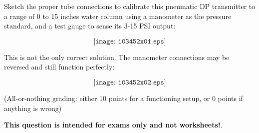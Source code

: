 

Sketch the proper tube connections to calibrate this pneumatic DP transmitter to a range of 0 to 15 inches water column using a manometer as the pressure standard, and a test gauge to sense its 3-15 PSI output:

$$\texttt{[image: i03452x01.eps]}$$







This is not the only correct solution.  The manometer connections may be reversed and still function perfectly:

$$\texttt{[image: i03452x02.eps]}$$

(All-or-nothing grading: either 10 points for a functioning setup, or 0 points if anything is wrong)







{\bf This question is intended for exams only and not worksheets!}.


